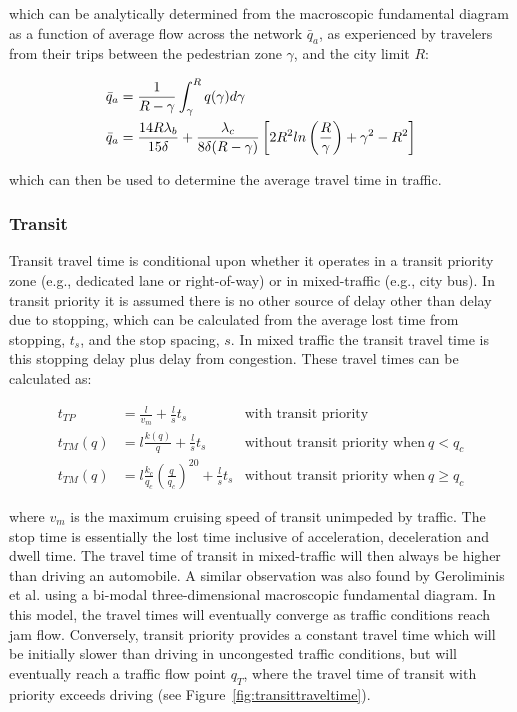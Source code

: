\documentclass{elsarticle}\usepackage[]{graphicx}\usepackage[]{color}
\begin{document}
\noindent which can be analytically determined from the macroscopic fundamental diagram as a function of average flow across the network $\bar{q}_a$, as experienced by travelers from their trips between the pedestrian zone $\gamma$, and the city limit $R$:

\begin{align}
    \bar{q}_a & = \frac{1}{R-\gamma}\int_\gamma^R q(\gamma) d\gamma \notag\\
    \bar{q}_a & = \frac{14R\lambda_{b}}{15\delta} +  \frac{\lambda_{c}}{8\delta (R - \gamma)} \left[ 2R^{2} ln \left( \frac{R}{\gamma}\right) + \gamma^{2} - R^{2}\right]
\end{align}

\noindent which can then be used to determine the average travel time in traffic.

\subsubsection{Transit}
Transit travel time is conditional upon whether it operates in a transit priority zone (e.g., dedicated lane or right-of-way) or in mixed-traffic (e.g., city bus). In transit priority it is assumed there is no other source of delay other than delay due to stopping, which can be calculated from the average lost time from stopping, $t_s$, and the stop spacing, $s$. In mixed traffic the transit travel time is this stopping delay plus delay from congestion. These travel times can be calculated as:

\begin{subequations}
\begin{align}
    t_{TP} & = \frac{l}{v_{m}} + \frac{l}{s}t_s & \text{with transit priority} \\
    t_{TM}(q) & = l\frac{k(q)}{q} + \frac{l}{s}t_s   & \text{without transit priority when}~q < q_c\\
    t_{TM}(q) & = l\frac{k_c}{q_c} \left(\frac{q}{q_c}\right)^{20} + \frac{l}{s}t_s & \text{without transit priority when}~q \geq q_c
\end{align}
\label{eq:ttfunc}
\end{subequations}

\noindent where $v_m$ is the maximum cruising speed of transit unimpeded by traffic. The stop time is essentially the lost time inclusive of acceleration, deceleration and dwell time. The travel time of transit in mixed-traffic will then always be higher than driving an automobile. A similar observation was also found by Geroliminis et al. \citep{Geroliminis2014} using a bi-modal three-dimensional macroscopic fundamental diagram. In this model, the travel times will eventually converge as traffic conditions reach jam flow. Conversely, transit priority provides a constant travel time which will be initially slower than driving in uncongested traffic conditions, but will eventually reach a traffic flow point $q_T$, where the travel time of transit with priority exceeds driving (see Figure~\ref{fig:transittraveltime}).
\end{document}
